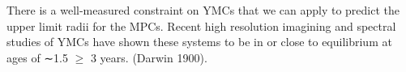 There is a well-measured constraint on YMCs that we can apply to predict the upper limit radii for the MPCs. Recent high resolution imagining and spectral studies of YMCs have shown these systems to be in or close to equilibrium at ages of ∼1.5 $\geq$ 3 years. (Darwin 1900). 